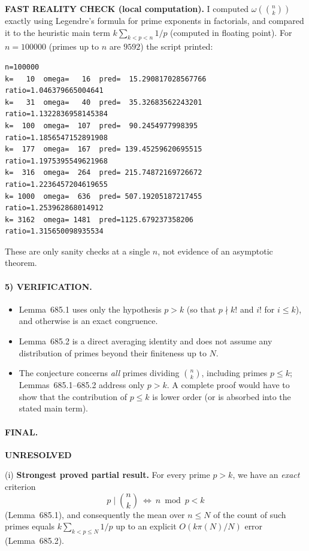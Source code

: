 \medskip
\noindent\textbf{FAST REALITY CHECK (local computation).}
I computed $\omega\!\left(\binom{n}{k}\right)$ exactly using Legendre's formula for prime exponents in factorials,
and compared it to the heuristic main term $k\sum_{k<p<n}1/p$ (computed in floating point).
For $n=100000$ (primes up to $n$ are $9592$) the script printed:
\begin{verbatim}
n=100000
k=   10  omega=   16  pred=  15.290817028567766  ratio=1.046379665004641
k=   31  omega=   40  pred=  35.32683562243201   ratio=1.1322836958145384
k=  100  omega=  107  pred=  90.2454977998395    ratio=1.1856547152891908
k=  177  omega=  167  pred= 139.45259620695515   ratio=1.1975395549621968
k=  316  omega=  264  pred= 215.74872169726672   ratio=1.2236457204619655
k= 1000  omega=  636  pred= 507.19205187217455   ratio=1.253962868014912
k= 3162  omega= 1481  pred=1125.679237358206     ratio=1.315650098935534
\end{verbatim}
These are only sanity checks at a single $n$, not evidence of an asymptotic theorem.

\paragraph{5) VERIFICATION.}
\begin{itemize}
\item Lemma~685.1 uses only the hypothesis $p>k$ (so that $p\nmid k!$ and $i!$ for $i\le k$), and otherwise is an exact congruence.
\item Lemma~685.2 is a direct averaging identity and does not assume any distribution of primes beyond their finiteness up to $N$.
\item The conjecture concerns \emph{all} primes dividing $\binom{n}{k}$, including primes $p\le k$; Lemmas~685.1--685.2 address only $p>k$.
A complete proof would have to show that the contribution of $p\le k$ is lower order (or is absorbed into the stated main term).
\end{itemize}

\paragraph{FINAL.}
\noindent\textbf{UNRESOLVED}

\smallskip
\noindent(i) \textbf{Strongest proved partial result.}
For every prime $p>k$, we have an \emph{exact} criterion
\[
p\mid \binom{n}{k}\ \Longleftrightarrow\ n\bmod p<k
\]
(Lemma~685.1), and consequently the mean over $n\le N$ of the count of such primes equals
$k\sum_{k<p\le N}1/p$ up to an explicit $O(k\pi(N)/N)$ error (Lemma~685.2).

